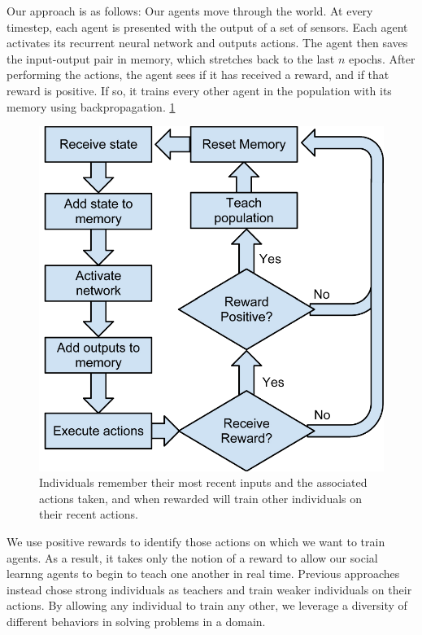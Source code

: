\documentclass{acm_proc_article-sp}
\begin{document}
Our approach is as follows:
Our agents move through the world. 
At every timestep, each agent is presented with the output of a set of sensors.  
Each agent activates its recurrent neural network and outputs actions.
The agent then saves the input-output pair in memory, which stretches back to the last $n$ epochs.
After performing the actions, the agent sees if it has received a reward, and if that reward is positive.
If so, it trains every other agent in the population with its memory using backpropagation. \ref{fig:flowchart}

\begin{figure}
  \centering
    \includegraphics[scale=.6]{flowchart.pdf}
  \caption{Individuals remember their most recent inputs and the associated actions taken, and when rewarded will train other individuals on their recent actions.}
  \label{fig:flowchart}
\end{figure}


We use positive rewards to identify those actions on which we want to train agents.
As a result, it takes only the notion of a reward to allow our social learnng agents to begin to teach one another in real time.
 Previous approaches \cite{?} instead chose strong individuals as teachers and train weaker individuals on their actions.
By allowing any individual to train any other, we leverage a diversity of different behaviors in solving problems in a domain.
\end{document}
